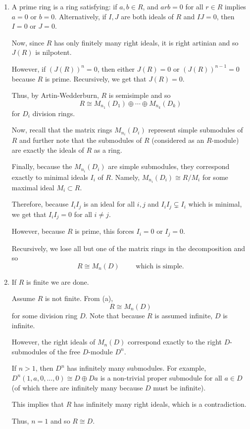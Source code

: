 \documentclass[12pt]{AlgebraQual}
\begin{document}
\begin{solution}$\,$
\begin{enumerate}[label=(\alph*)]
    \item A prime ring is a ring satisfying: if $a,b\in R$, and $arb=0$ for all $r\in R$ implies $a=0$ or $b=0.$ Alternatively, if $I,J$ are both ideals of $R$ and $IJ=0$, then $I=0$ or $J=0.$

    Now, since $R$ has only finitely many right ideals, it is right artinian and so $J(R)$ is nilpotent.

    However, if $(J(R))^n=0$, then either $J(R)=0$ or $(J(R))^{n-1}=0$ because $R$ is prime. Recursively, we get that $J(R)=0.$

    Thus, by Artin-Wedderburn, $R$ is semisimple and so $$R\cong M_{n_1}(D_1)\oplus\cdots\oplus M_{n_k}(D_k)$$ for $D_i$ division rings.

    Now, recall that the matrix rings $M_{n_i}(D_i)$ represent simple submodules of $R$ and further note that the submodules of $R$ (considered as an $R$-module) are exactly the ideals of $R$ as a ring.

    Finally, because the $M_{n_i}(D_i)$ are simple submodules, they correspond exactly to minimal ideals $I_i$ of $R$. Namely, $M_{n_i}(D_i)\cong R/M_i$ for some maximal ideal $M_i\subset R$.

    Therefore, because $I_iI_j$ is an ideal for all $i,j$ and $I_iI_j\subsetneq I_i$ which is minimal, we get that $I_iI_j=0$ for all $i\not=j.$

    However, because $R$ is prime, this forces $I_i=0$ or $I_j=0$.

    Recursively, we lose all but one of the matrix rings in the decomposition and so $$R\cong M_n(D)\qquad\text{ which is simple.}$$

    \item If $R$ is finite we are done.

    Assume $R$ is not finite. From (a), $$R\cong M_n(D)$$ for some division ring $D$. Note that because $R$ is assumed infinite, $D$ is infinite.

    However, the right ideals of $M_n(D)$ correspond exactly to the right $D$-submodules of the free $D$-module $D^n.$ %

    If $n>1$, then $D^n$ has infinitely many submodules. For example, $D^n(1,a,0,...,0)\cong D\oplus Da$ is a non-trivial proper submodule for all $a\in D$ (of which there are infinitely many because $D$ must be infinite).

    This implies that $R$ has infinitely many right ideals, which is a contradiction.

    Thus, $n=1$ and so $R\cong D.$
\end{enumerate}
\end{solution}
\newpage
\end{document}
